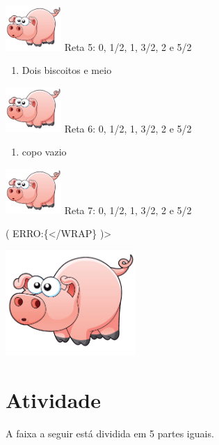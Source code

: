 \documentclass[a4,12pt]{book}
\begin{document}
\includegraphics[width=60pt, keepaspectratio]{pig}
Reta 5: 0, 1/2, 1, 3/2, 2 e 5/2

\begin{enumerate} [\quad a)] %
  \item     Dois biscoitos e meio
\end{enumerate} %

\includegraphics[width=60pt, keepaspectratio]{pig}
Reta 6: 0, 1/2, 1, 3/2, 2 e 5/2

\begin{enumerate} [\quad a)] %
  \item     copo vazio
\end{enumerate} %

\includegraphics[width=60pt, keepaspectratio]{pig}
Reta 7: 0, 1/2, 1, 3/2, 2 e 5/2

( ERRO:\{</WRAP\} )>







\includegraphics[width=\textwidth,height=4cm, keepaspectratio]{pig}
\section{Atividade}







A faixa a seguir está dividida em 5 partes iguais.
\end{document}
